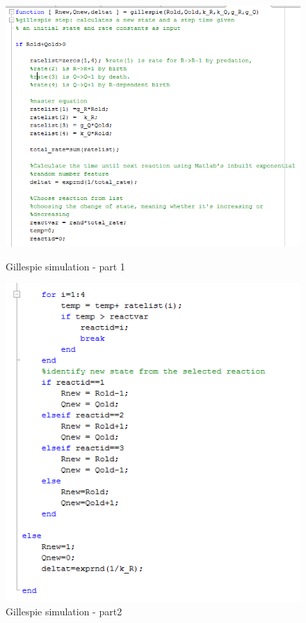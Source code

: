 \documentclass[a4paper]{article}
\begin{document}
\begin{figure}[ht]
\centering
\begin{minipage}[b]{0.51\textwidth}
\includegraphics[width=\textwidth]{code_part1_q2.PNG}
\caption{Gillespie simulation - part 1}
\label{fig:gillespie part1}
\end{minipage}
\quad
\begin{minipage}[b]{0.39\textwidth}
\includegraphics[width=\textwidth]{code_part2_q2.PNG}
\caption{Gillespie simulation - part2}
\label{fig:gillespie part2}
\end{minipage}
\end{figure}
\end{document}
